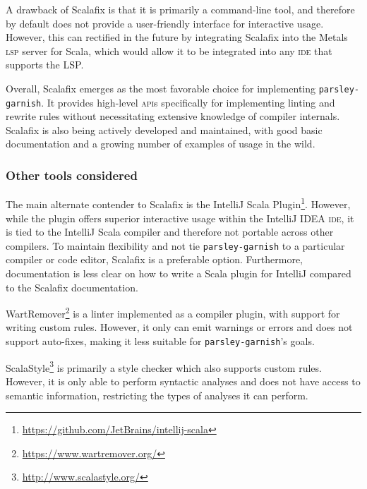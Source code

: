 A drawback of Scalafix is that it is primarily a command-line tool, and therefore by default does not provide a user-friendly interface for interactive usage.
However, this can rectified in the future by integrating Scalafix into the Metals \textsc{lsp} server for Scala, which would allow it to be integrated into any \textsc{ide} that supports the LSP.

Overall, Scalafix emerges as the most favorable choice for implementing \texttt{parsley-garnish}.
It provides high-level \textsc{api}s specifically for implementing linting and rewrite rules without necessitating extensive knowledge of compiler internals.
Scalafix is also being actively developed and maintained, with good basic documentation and a growing number of examples of usage in the wild.

\subsubsection{Other tools considered}
The main alternate contender to Scalafix is the IntelliJ Scala Plugin\footnote{\url{https://github.com/JetBrains/intellij-scala}}.
However, while the plugin offers superior interactive usage within the IntelliJ IDEA \textsc{ide}, it is tied to the IntelliJ Scala compiler and therefore not portable across other compilers.
To maintain flexibility and not tie \texttt{parsley-garnish} to a particular compiler or code editor, Scalafix is a preferable option.
Furthermore, documentation is less clear on how to write a Scala plugin for IntelliJ compared to the Scalafix documentation.

WartRemover\footnote{\url{https://www.wartremover.org/}} is a linter implemented as a compiler plugin, with support for writing custom rules.
However, it only can emit warnings or errors and does not support auto-fixes, making it less suitable for \texttt{parsley-garnish}'s goals.

ScalaStyle\footnote{\url{http://www.scalastyle.org/}} is primarily a style checker which also supports custom rules.
However, it is only able to perform syntactic analyses and does not have access to semantic information, restricting the types of analyses it can perform.

